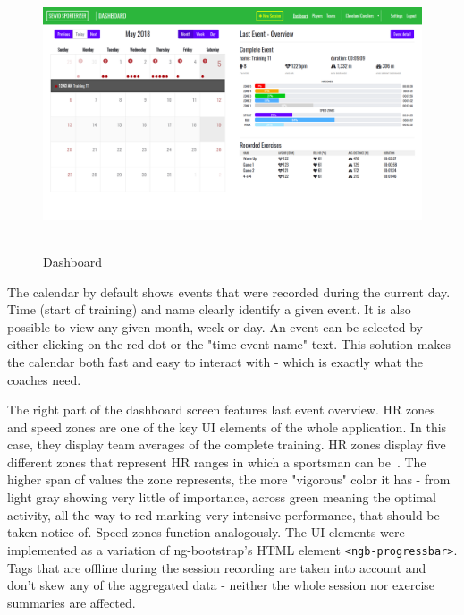 \begin{figure}[htb]
\begin{center}
  \includegraphics*[width=14cm,height=8cm,keepaspectratio]{images/dashboard_implem}
\end{center}
\caption{Dashboard}
\label{img:dashboard_implem}
\end{figure}

The calendar by default shows events that were recorded during the current day. Time (start of training) and name clearly identify a given event. It is also possible to view any given month, week or day. An event can be selected by either clicking on the red dot or the "time event-name" text. This solution makes the calendar both fast and easy to interact with - which is exactly what the coaches need.

The right part of the dashboard screen features last event overview. HR zones and speed zones are one of the key UI elements of the whole application. In this case, they display team averages of the complete training. HR zones display five different zones that represent HR ranges in which a sportsman can be~\cite{HRzones}. The higher span of values the zone represents, the more "vigorous" color it has - from light gray showing very little of importance, across green meaning the optimal activity, all the way to red marking very intensive performance, that should be taken notice of. Speed zones function analogously. The UI elements were implemented as a variation of ng-bootstrap’s HTML element \texttt{<ngb-progressbar>}. Tags that are offline during the session recording are taken into account and don’t skew any of the aggregated data - neither the whole session nor exercise summaries are affected.

